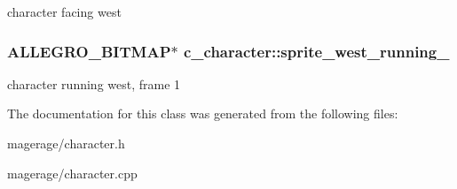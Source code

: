 character facing west \hypertarget{classc__character_aef269ee1bc3fb08b89a8b254c20e8262}{
\subsubsection[{sprite\-\_\-west\-\_\-running\-\_\-2}]{\setlength{\rightskip}{0pt plus 5cm}A\-L\-L\-E\-G\-R\-O\-\_\-\-B\-I\-T\-M\-A\-P$\ast$ c\-\_\-character\-::sprite\-\_\-west\-\_\-running\-\_\hspace{0.3cm}{\ttfamily [protected]}}}\label{classc__character_aef269ee1bc3fb08b89a8b254c20e8262}
character running west, frame 1 

The documentation for this class was generated from the following files\-:\begin{DoxyCompactItemize}
\item 
magerage/character.\-h\item 
magerage/character.\-cpp\end{DoxyCompactItemize}
